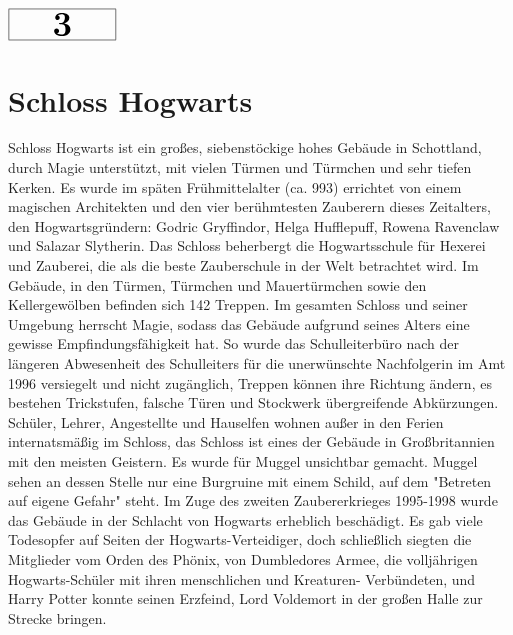 \documentclass[a4paper, 10pt]{article}
\begin{document}
\begin{minipage}[t]{\textwidth}
    \vspace*{-1.5cm} %
    \begin{flushright}
        \hspace*{\fill} %
        $\boxed{\textbf{\Huge\phantom{00}3\phantom{00}}}$ %
    \end{flushright}
\end{minipage}

\section*{\huge Schloss Hogwarts}
Schloss Hogwarts ist ein großes, siebenstöckige hohes Gebäude in Schottland, durch Magie unterstützt, mit vielen Türmen und Türmchen und sehr tiefen Kerken. Es wurde im späten Frühmittelalter (ca. 993) errichtet von einem magischen Architekten und den vier berühmtesten Zauberern dieses Zeitalters, den Hogwartsgründern: Godric Gryffindor, Helga Hufflepuff, Rowena Ravenclaw und Salazar Slytherin. Das Schloss beherbergt die Hogwartsschule für Hexerei und Zauberei, die als die beste Zauberschule in der Welt betrachtet wird.
\vspace{10pt}
\newline
{}  
Im Gebäude, in den Türmen, Türmchen und Mauertürmchen sowie den Kellergewölben befinden sich 142 Treppen. Im gesamten Schloss und seiner Umgebung herrscht Magie, sodass das Gebäude aufgrund seines Alters eine gewisse Empfindungsfähigkeit hat. So wurde das Schulleiterbüro nach der längeren Abwesenheit des Schulleiters für die unerwünschte Nachfolgerin im Amt 1996 versiegelt und nicht zugänglich, Treppen können ihre Richtung ändern, es bestehen Trickstufen, falsche Türen und Stockwerk übergreifende Abkürzungen.
\vspace{10pt}
\newline
{}  
Schüler, Lehrer, Angestellte und Hauselfen wohnen außer in den Ferien internatsmäßig im Schloss, das Schloss ist eines der Gebäude in Großbritannien mit den meisten Geistern.
\vspace{10pt}
\newline
{}  
Es wurde für Muggel unsichtbar gemacht. Muggel sehen an dessen Stelle nur eine Burgruine mit einem Schild, auf dem "Betreten auf eigene Gefahr" steht.
\vspace{10pt}
\newline
{}  
Im Zuge des zweiten Zaubererkrieges 1995-1998 wurde das Gebäude in der Schlacht von Hogwarts erheblich beschädigt. Es gab viele Todesopfer auf Seiten der Hogwarts-Verteidiger, doch schließlich siegten die Mitglieder vom Orden des Phönix, von Dumbledores Armee, die volljährigen Hogwarts-Schüler mit ihren menschlichen und Kreaturen- Verbündeten, und Harry Potter konnte seinen Erzfeind, Lord Voldemort in der großen Halle zur Strecke bringen.
\end{document}
